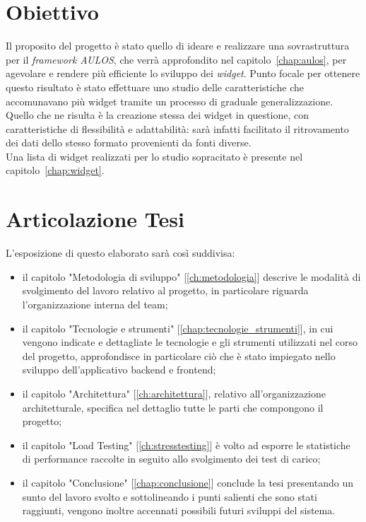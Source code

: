 \pagebreak
\section{Obiettivo}
Il proposito del progetto è stato quello di ideare e realizzare una sovrastruttura per il \textit{framework AULOS}, che verrà approfondito nel capitolo~\ref{chap:aulos}, per agevolare e rendere più efficiente lo sviluppo dei \textit{widget}. Punto focale per ottenere questo risultato è stato effettuare uno studio delle caratteristiche che accomunavano più widget tramite un processo di graduale generalizzazione.
Quello che ne risulta è la creazione stessa dei widget in questione, con caratteristiche di flessibilità e adattabilità: sarà infatti facilitato il ritrovamento dei dati dello stesso formato provenienti da fonti diverse. \\
Una lista di widget realizzati per lo studio sopracitato è presente nel capitolo~\ref{chap:widget}.

\section{Articolazione Tesi}
L'esposizione di questo elaborato sarà così suddivisa:
\begin{itemize}
    \item il capitolo "Metodologia di sviluppo" [\ref{ch:metodologia}] descrive le modalità di svolgimento del lavoro relativo al progetto, in particolare riguarda l'organizzazione interna del team;
    \item il capitolo "Tecnologie e strumenti" [\ref{chap:tecnologie_strumenti}], in cui vengono indicate e dettagliate le tecnologie e gli strumenti utilizzati nel corso del progetto, approfondisce in particolare ciò che è stato impiegato nello sviluppo dell'applicativo backend e frontend;
    \item il capitolo "Architettura" [\ref{ch:architettura}], relativo all'organizzazione architetturale, specifica nel dettaglio tutte le parti che compongono il progetto;
    \item il capitolo "Load Testing" [\ref{ch:stresstesting}] è volto ad esporre le statistiche di performance raccolte in seguito allo svolgimento dei test di carico;
    \item il capitolo "Conclusione" [\ref{chap:conclusione}] conclude la tesi presentando un sunto del lavoro svolto e sottolineando i punti salienti che sono stati raggiunti, vengono inoltre accennati possibili futuri sviluppi del sistema.
\end{itemize}